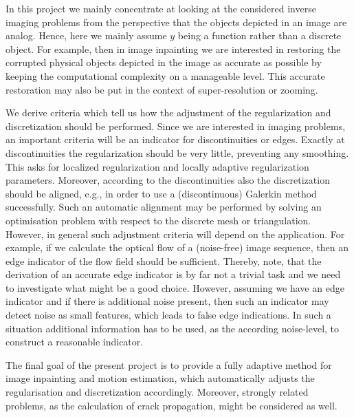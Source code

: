 \documentclass[enabledeprecatedfontcommands,cleardoublepage=empty,headsepline,twoside,11pt,DIV=15,BCOR=12mm,final]{scrartcl}
\begin{document}
In this project we mainly concentrate at looking at the considered inverse imaging problems from the perspective that the objects depicted in an image are analog. %
Hence, here we mainly assume $y$ being a function rather than a discrete object. For example, then in image inpainting we are interested in restoring the corrupted physical objects depicted in the image as accurate as possible by keeping the computational complexity on a manageable level. This accurate restoration may also be put in the context of super-resolution or zooming.

We derive criteria which tell us how the adjustment of the regularization and discretization should be performed. Since we are interested in imaging problems, an important criteria will be an indicator for discontinuities or edges. Exactly at discontinuities the regularization should be very little, preventing any smoothing. This asks for localized regularization and locally adaptive regularization parameters. Moreover, according to the discontinuities also the discretization should be aligned, e.g., in order to use a (discontinuous) Galerkin method successfully. Such an automatic alignment may be performed by solving an optimisation problem with respect to the discrete mesh or triangulation. However, in general such adjustment criteria will depend on the application. For example, if we calculate the optical flow of a (noise-free) image sequence, then an edge indicator of the flow field should be sufficient. Thereby, note, that the derivation of an accurate edge indicator is by far not a trivial task and we need to investigate what might be a good choice. However, assuming we have an edge indicator and if there is additional noise present, then such an indicator may detect noise as small features, which leads to false edge indications. In such a situation additional information has to be used, as the according noise-level, to construct a reasonable indicator. 

The final goal of the present project is to provide a fully adaptive method for image inpainting and motion estimation, which automatically adjusts the regularisation and discretization accordingly. Moreover, strongly related problems, as the calculation of crack propagation, might be considered as well.
\end{document}
